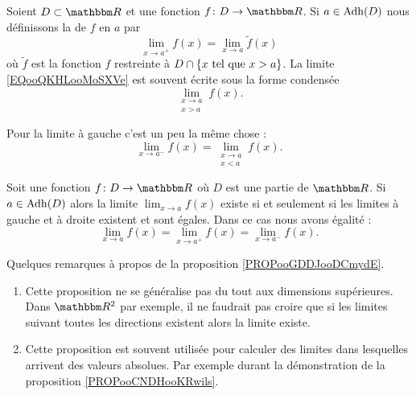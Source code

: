 \begin{definition}
    Soient \( D\subset \eR\) et une fonction \( f\colon D\to \eR\). Si \( a\in \operatorname{Adh}(D)\) nous définissons la  de \( f\) en \( a\) par
    \begin{equation}        \label{EQooQKHLooMoSXVe}
        \lim_{x\to a^+} f(x)=\lim_{x\to a} \tilde f(x)
    \end{equation}
    où \( \tilde f\) est la fonction \( f\) restreinte à \( D\cap\{ x\text{ tel que } x>a \}\). La limite \eqref{EQooQKHLooMoSXVe} est souvent écrite sous la forme condensée
    \begin{equation}
        \lim_{\substack{x\to a\\x>a}}f(x).
    \end{equation}

    Pour la limite à gauche c'est un peu la même chose :
    \begin{equation}
        \lim_{x\to a^-} f(x)=\lim_{\substack{x\to a\\x<a}}f(x).
    \end{equation}
\end{definition}

\begin{proposition}      \label{PROPooGDDJooDCmydE}
    Soit une fonction \( f\colon D\to \eR\) où \( D\) est une partie de \( \eR\). Si \( a\in \operatorname{Adh}(D)\) alors la limite \( \lim_{x\to a} f(x)\) existe si et seulement si les limites à gauche et à droite existent et sont égales. Dans ce cas nous avons égalité :
    \begin{equation}
        \lim_{x\to a} f(x)=\lim_{x\to a^+} f(x)=\lim_{x\to a^-} f(x).
    \end{equation}
\end{proposition}

\begin{normaltext}
    Quelques remarques à propos de la proposition \ref{PROPooGDDJooDCmydE}.
    \begin{enumerate}
        \item
            
    Cette proposition ne se généralise pas du tout aux dimensions supérieures. Dans \( \eR^2\) par exemple, il ne faudrait pas croire que si les limites suivant toutes les directions existent alors la limite existe.
\item
    Cette proposition est souvent utilisée pour calculer des limites dans lesquelles arrivent des valeurs absolues. Par exemple durant la démonstration de la proposition \ref{PROPooCNDHooKRwils}.
    \end{enumerate}
\end{normaltext}

